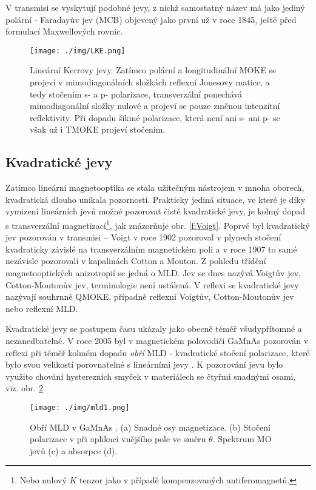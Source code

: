 V transmisi se vyskytují podobné jevy, z nichž samostatný název má jako jediný polární - Faradayův jev (MCB) objevený jako první už v roce 1845, ještě před formulací Maxwellových rovnic. \cite{ZvezdinKotov}


\begin{figure}\center
\texttt{[image: ./img/LKE.png]}
\caption{Lineární Kerrovy jevy\cite{Silber}. Zatímco polární a longitudinální MOKE se projeví v mimodiagonálních složkách reflexní Jonesovy matice, a tedy stočením s- a p- polarizace, transverzální ponechává mimodiagonální složky nulové a projeví se pouze změnou intenzitní reflektivity. Při dopadu šikmé polarizace, která není ani s- ani p- se však už i TMOKE projeví stočením.}\label{f:KE}
\end{figure}

\subsection*{Kvadratické jevy}

Zatímco lineární magnetooptika se stala užitečným nástrojem v mnoha oborech, kvadratická dlouho unikala pozornosti.
Prakticky jediná situace, ve které je díky vymizení lineárních jevů možné pozorovat čistě kvadratické jevy, je kolmý dopad s transverzální magnetizací\footnote{Nebo nulový $K$ tenzor jako v případě kompenzovaných antiferomagnetů.}, jak znázorňuje obr. \ref{f:Voigt}.
Poprvé byl kvadratický jev pozorován v transmisi -- Voigt v roce 1902 pozoroval v plynech stočení kvadraticky závislé na transverzálním magnetickém poli a v roce 1907 to samé nezávisle pozorovali v kapalinách Cotton a Mouton. \cite{ZvezdinKotov}
Z pohledu třídění magnetooptických anizotropií se jedná o MLD.
Jev se dnes nazývá Voigtův jev, Cotton-Moutonův jev, terminologie není ustálená.
V reflexi se kvadratické jevy nazývají souhrnně QMOKE, případně reflexní Voigtův, Cotton-Moutonův jev nebo reflexní MLD.

Kvadratické jevy se postupem času ukázaly jako obecně téměř všudypřítomné a nezanedbatelné.
V roce 2005 byl v magnetickém polovodiči GaMnAs pozorován v reflexi při téměř kolmém dopadu \emph{obří} MLD - kvadratické stočení polarizace, které bylo svou velikostí porovnatelné s lineárními jevy  \cite{pozor2}.
K pozorování jevu bylo využito chování hysterezních smyček v materiálech se čtyřmi snadnými osami, viz. obr. \ref{f:giant mld}

\begin{figure}
    \centering
    \texttt{[image: ./img/mld1.png]}
    \caption{Obří MLD v GaMnAs \cite{pozor2}. (a) Snadné osy magnetizace. (b) Stočení polarizace v při aplikaci vnějšího pole ve směru $\theta$. Spektrum MO jevů (c) a absorpce (d).}
    \label{f:giant mld}
\end{figure}

